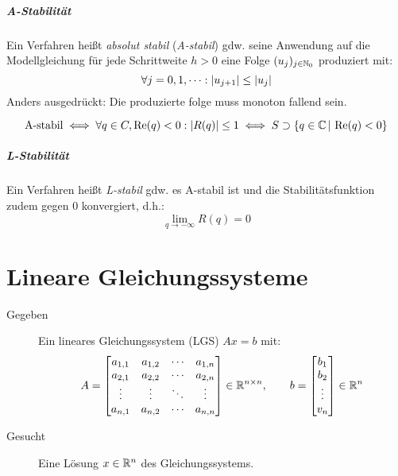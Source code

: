 			\paragraph{A-Stabilität}
				Ein Verfahren heißt \textit{absolut stabil} (\textit{A-stabil}) gdw. seine Anwendung auf die Modellgleichung für jede Schrittweite \( h > 0 \) eine Folge \( (u_j)_{j \in \mathbb{N}_0} \) produziert mit:
				\begin{equation*}
					\forall j = 0, 1, \cdots : \abs{u_{j+1}} \leq \abs{u_j}
				\end{equation*}
				Anders ausgedrückt: Die produzierte folge muss monoton fallend sein.

				\begin{equation*}
					\textrm{A-stabil} \iff \forall q \in C, \Re(q) < 0 : \abs{R(q)} \leq 1 \iff S \supset \{ q \in \mathbb{C} \,\vert\, \Re(q) < 0 \}
				\end{equation*}

			\paragraph{L-Stabilität}
				Ein Verfahren heißt \textit{L-stabil} gdw. es A-stabil ist und die Stabilitätsfunktion zudem gegen \(0\) konvergiert, d.h.:
				\begin{equation*}
					\lim\limits_{q \rightarrow -\infty} R(q) = 0
				\end{equation*}

\chapter{Lineare Gleichungssysteme}
	\begin{description}
		\item[Gegeben] Ein lineares Gleichungssystem (LGS) \( Ax = b \) mit:
			\begin{equation*}
				A =
				\begin{bmatrix}
					a_{1,1} & a_{1,2} & \cdots & a_{1,n} \\
					a_{2,1} & a_{2,2} & \cdots & a_{2,n} \\
					\vdots  & \vdots  & \ddots & \vdots  \\
					a_{n,1} & a_{n,2} & \cdots & a_{n,n}
				\end{bmatrix}
				\in \mathbb{R}^{n \times n}, \qquad
				b =
				\begin{bmatrix}
					b_1    \\
					b_2    \\
					\vdots \\
					v_n
				\end{bmatrix}
				\in \mathbb{R}^n
			\end{equation*}
		\item[Gesucht] Eine Lösung \( x \in \mathbb{R}^n \) des Gleichungssystems.
	\end{description}

